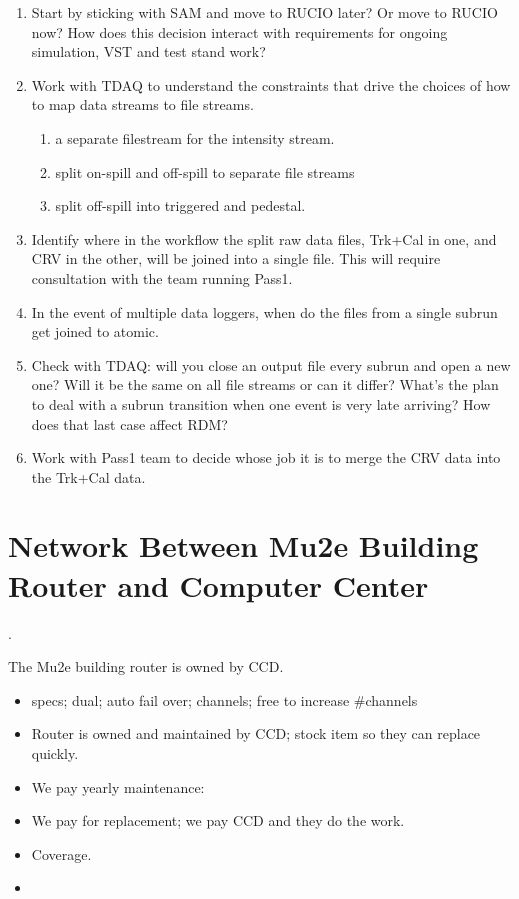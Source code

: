 \begin{enumerate}
\item Start by sticking with SAM and move to RUCIO later?  Or move to RUCIO now?
  How does this decision interact with requirements for ongoing simulation, VST
  and test stand work?
\item Work with TDAQ to understand the constraints that drive the choices of how to
  map data streams to file streams.
  \begin{enumerate}
    \item a separate filestream for the intensity stream.
    \item split on-spill and off-spill to separate file streams
    \item split off-spill into triggered and pedestal.
  \end{enumerate}
\item Identify where in the workflow the split raw data files, Trk+Cal in one,
  and CRV in the other, will be joined into a single file.  This will require consultation with the team running
  Pass1.
\item In the event of multiple data loggers, when do the files from a single subrun get joined to atomic.
\item Check with TDAQ: will you close an output file every subrun and open a new one? Will it be the same
  on all file streams or can it differ?  What's the plan to deal with a subrun transition when one
  event is very late arriving?  How does that last case affect RDM?
\item Work with Pass1 team to decide whose job it is to merge the CRV data into the Trk+Cal data.
\end{enumerate}


\appendix

\chapter{Network Between Mu2e Building Router and Computer Center}
\label{app:RouterAndNetwork}.

The Mu2e building router is owned by CCD.
\begin{itemize}
\item specs; dual; auto fail over; channels; free to increase \#channels
\item Router is owned and maintained by CCD; stock item so they can replace quickly.
\item We pay yearly maintenance: 
\item We pay for replacement; we pay CCD and they do the work. 
\item {} Coverage.
\item {}
\end{itemize}


